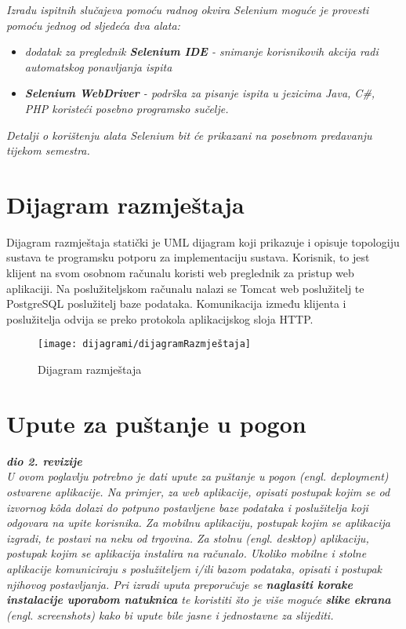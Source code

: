 			 \textit{Izradu ispitnih slučajeva pomoću radnog okvira Selenium moguće je provesti pomoću jednog od sljedeća dva alata:}
			 \begin{itemize}
			 	\item \textit{dodatak za preglednik \textbf{Selenium IDE} - snimanje korisnikovih akcija radi automatskog ponavljanja ispita	}
			 	\item \textit{\textbf{Selenium WebDriver} - podrška za pisanje ispita u jezicima Java, C\#, PHP koristeći posebno programsko sučelje.}
			 \end{itemize}
		 	\textit{Detalji o korištenju alata Selenium bit će prikazani na posebnom predavanju tijekom semestra.}
			
			\eject 
		
		
		\section{Dijagram razmještaja}
		
			Dijagram razmještaja statički je UML dijagram koji prikazuje i opisuje topologiju sustava te programsku potporu za implementaciju sustava. Korisnik, to jest klijent na svom osobnom računalu koristi web preglednik za pristup web aplikaciji. Na poslužiteljskom računalu nalazi se Tomcat web poslužitelj te PostgreSQL poslužitelj baze podataka. Komunikacija između klijenta i poslužitelja odvija se preko protokola aplikacijskog sloja HTTP.
			
			\begin{figure}[H]
				\texttt{[image: dijagrami/dijagramRazmještaja]} %
				\centering
				\caption{Dijagram razmještaja}
				\label{fig:dijagramRazmjestaja}
			\end{figure}
			
			 
			\eject 
		
		\section{Upute za puštanje u pogon}
		
			\textbf{\textit{dio 2. revizije}}\\
		
			 \textit{U ovom poglavlju potrebno je dati upute za puštanje u pogon (engl. deployment) ostvarene aplikacije. Na primjer, za web aplikacije, opisati postupak kojim se od izvornog kôda dolazi do potpuno postavljene baze podataka i poslužitelja koji odgovara na upite korisnika. Za mobilnu aplikaciju, postupak kojim se aplikacija izgradi, te postavi na neku od trgovina. Za stolnu (engl. desktop) aplikaciju, postupak kojim se aplikacija instalira na računalo. Ukoliko mobilne i stolne aplikacije komuniciraju s poslužiteljem i/ili bazom podataka, opisati i postupak njihovog postavljanja. Pri izradi uputa preporučuje se \textbf{naglasiti korake instalacije uporabom natuknica} te koristiti što je više moguće \textbf{slike ekrana} (engl. screenshots) kako bi upute bile jasne i jednostavne za slijediti.}
			
